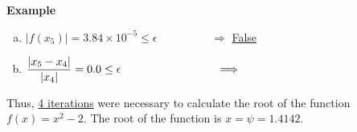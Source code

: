 \begin{MyExample}{\begin{center}{\bf Example}\end{center}}
\begin{list}{{\bf Iteration } (k=):~}{}
                    \begin{enumerate}[(a)]
                         \item $\left|f\left(x_{5}\right)\right| = 3.84\times 10^{-5} \leq \epsilon \hspace{2cm} \Longrightarrow$ \underline{False}
                         \item $\frc{\left|x_{5}-x_{4}\right|}{\left|x_{4}\right|} = 0.0 \leq \epsilon \hspace{3cm} \Longrightarrow$ 
                    \end{enumerate}
         \end{list}
         Thus, \underline{4 iterations} were necessary to calculate the root of the function $f(x)=x^{2}-2$. The root of the function is \underline{$x=\psi=1.4142$}.
   \end{MyExample}
         

